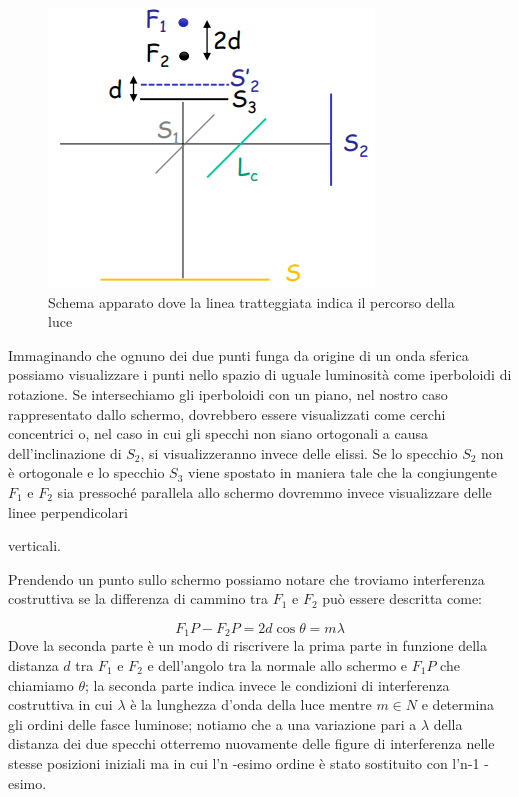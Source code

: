 \documentclass{article}
\begin{document}
\begin{figure}[h!]
  \centering
  \includegraphics[width=0.3\linewidth]{IM fuochi}
  \caption{Schema apparato dove la linea tratteggiata indica il percorso della luce}
\end{figure}


Immaginando che ognuno dei due punti funga da origine di un onda sferica possiamo visualizzare i punti nello spazio di uguale luminosità come iperboloidi di rotazione. Se intersechiamo gli iperboloidi con un piano, nel nostro caso rappresentato dallo schermo, dovrebbero essere visualizzati come cerchi concentrici o, nel caso in cui gli specchi non siano ortogonali a causa dell'inclinazione di $S_2$, si visualizzeranno invece delle elissi. 
Se lo specchio $S_2$ non è ortogonale e lo specchio $S_3$ viene spostato in maniera tale che la congiungente $F_1$ e $F_2$ sia pressoché parallela allo schermo dovremmo invece visualizzare delle linee perpendicolari  verticali. 

Prendendo un punto sullo schermo possiamo notare che troviamo interferenza costruttiva se la differenza di cammino tra $F_1$ e $F_2$ può essere descritta come:

\begin{equation} 
F_1P - F_2 P = 2d \cos{\theta} = m \lambda 
\end{equation}
Dove la seconda parte è un modo di riscrivere la prima parte in funzione della distanza $d$ tra $F_1$ e $F_2$ e dell'angolo tra la normale allo schermo e $F_1 P$ che chiamiamo $\theta$; la seconda parte indica invece le condizioni di interferenza costruttiva in cui $\lambda$ è la lunghezza d'onda della luce mentre $m \in N$ %
e determina gli ordini delle fasce luminose; notiamo che a una variazione pari a $\lambda$ della distanza dei due specchi otterremo nuovamente delle figure di interferenza nelle stesse posizioni iniziali ma in cui l'n -esimo ordine è stato sostituito con l'n-1 -esimo.
\end{document}
